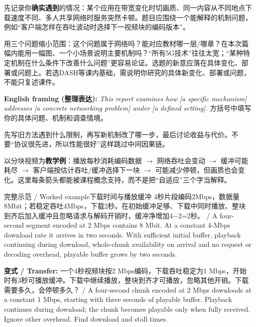 

先记录你\textbf{确实遇到}的情况：某个应用在带宽变化时切画质、同一内容从不同地点下载速度不同、多人共享网络时服务突然卡顿。题目应围绕一个能解释的机制问题，例如“客户端怎样在吞吐波动时选择下一视频块的编码版本”。


用三个问题缩小范围：这个问题属于网络吗？能对应教材哪一层/哪章？在本次篇幅内能用一幅图、一个小场景说明主要机制吗？“所有5G技术”往往太宽；“某种特定机制在什么条件下改善什么问题”更容易论证。选题的新意应落在具体变化、部署或问题上。若选DASH等课内基础，需说明你研究的具体新变化、部署或问题，不能只复述课件。


\textbf{English framing (整理表达):} \emph{This report examines how [a specific mechanism] addresses [a concrete networking problem] under [a defined setting].} 方括号中填写你的具体问题、机制和调查情境。





先写旧方法遇到什么限制，再写新机制改了哪一步，最后讨论收益与代价。不要“协议很先进，所以性能很好”这样跳过中间因果链。


以分块视频为\textbf{教学例}：播放每秒消耗编码数据 \ensuremath{\to} 网络吞吐会变动 \ensuremath{\to} 缓冲可能耗尽 \ensuremath{\to} 客户端按估计吞吐/缓冲选择下一块 \ensuremath{\to} 可能减少停顿，但画质也会变化。这里每条箭头都能被课程概念支持，而不是把“自适应”三个字当解释。


\begin{StudyBlock}{完整示范 / Worked example}{下载时间与播放缓冲}
4秒片段编码2Mbps，数据量8Mbit；若稳定吞吐4Mbps，下载2秒。在初始缓冲足够、下载中同时播放、整块到齐后加入缓冲且忽略请求与解码开销时，缓冲净增加4\ensuremath{-}2=2秒。 / A four-second segment encoded at 2 Mbps contains 8 Mbit. At a constant 4-Mbps download rate it arrives in two seconds. With sufficient initial buffer, playback continuing during download, whole-chunk availability on arrival and no request or decoding overhead, playable buffer grows by two seconds.
\end{StudyBlock}


\textbf{变式 / Transfer:} 一个4秒视频块按2 Mbps编码，下载吞吐稳定为1 Mbps，开始时有3秒可播放缓冲。下载中继续播放，整块到齐才可播放，忽略其他开销。下载需要多久，会停顿多久？ / A four-second chunk encoded at 2 Mbps downloads at a constant 1 Mbps, starting with three seconds of playable buffer. Playback continues during download; the chunk becomes playable only when fully received. Ignore other overhead. Find download and stall times.



